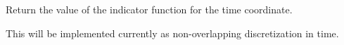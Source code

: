 \documentclass[letterpaper,10pt,english]{sphinxmanual}
\begin{document}
\begin{fulllineitems}
\begin{fulllineitems}
\end{fulllineitems}


\begin{fulllineitems}
\label{applications/applications.doc:basisFunctions.Pyramid.time_indicator}
Return the value of the indicator function for the time coordinate.

This will be implemented currently as non-overlapping discretization in time.

\end{fulllineitems}


\end{fulllineitems}

\end{document}
